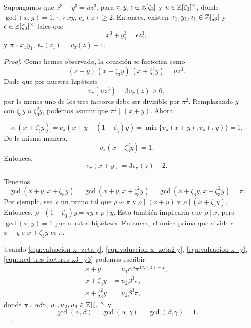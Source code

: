 \begin{lema}[Descenso]
  \label{lema:FLT-3-3}
  Supongamos que $x^3 + y^3 = uz^3$, para $x,y,z\in \mathbb{Z}[\zeta_3]$ y
  $u \in \mathbb{Z} [\zeta_3]^\times$, donde $\gcd (x,y) = 1$, $\pi \nmid xy$,
  $v_\pi (z) \ge 2$. Entonces, existen $x_1, y_1, z_1 \in \mathbb{Z} [\zeta_3]$
  y $\epsilon \in \mathbb{Z} [\zeta_3]^\times$ tales que
  $$x_1^3 + y_1^3 = \epsilon z_1^3,$$
  y $\pi \nmid x_1 y_1$, $v_\pi (z_1) = v_\pi (z) - 1$.

  \begin{proof}
    Como hemos observado, la ecuación se factoriza como
    $$(x + y) \, (x + \zeta_3 y) \, (x + \zeta_3^2 y) = uz^3.$$
    Dado que por nuestra hipótesis
    $$v_\pi (uz^3) = 3 v_\pi (z) \ge 6,$$
    por lo menos uno de los tres factores debe ser divisible por
    $\pi^2$. Remplazando $y$ con $\zeta_3 y$ o $\zeta_3^2 y$, podemos asumir que
    $\pi^2 \mid (x + y)$. Ahora

    \begin{equation}
      \label{eqn:valuacion-x+zeta-y}
      v_\pi (x + \zeta_3 y) = v_\pi (x + y - (1 - \zeta_3) y)
          = \min \{ v_\pi (x+y), v_\pi (\pi y) \} = 1.
    \end{equation}
    De la misma manera,
    \begin{equation}
      \label{eqn:valuacion-x+zeta2-y}
      v_\pi (x + \zeta_3^2 y) = 1.
    \end{equation}
    Entonces,
    \begin{equation}
      \label{eqn:valuacion-x+y}
      v_\pi (x+y) = 3 v_\pi (z) - 2.
    \end{equation}

    Tenemos
    \begin{equation}
      \label{eqn:mcd-tres-factores-x3+y3}
      \gcd (x + y, x + \zeta_3 y) = \gcd (x + y, x + \zeta_3^2 y)
          = \gcd (x + \zeta_3 y, x + \zeta_3^2 y) = \pi.
    \end{equation}
    Por ejemplo, sea $\rho$ un primo tal que $\rho \not\sim \pi$ y
    $\rho \mid (x+y)$ y $\rho \mid (x + \zeta_3 y)$. Entonces,
    $\rho \mid (1 - \zeta_3) y = \pi y$ e $\rho \mid y$. Esto también implicaría
    que $\rho \mid x$, pero $\gcd (x,y) = 1$ por nuestra hipótesis. Entonces,
    el único primo que divide a $x + y$ e $x + \zeta_3 y$ es $\pi$.

    Usando \eqref{eqn:valuacion-x+zeta-y}, \eqref{eqn:valuacion-x+zeta2-y},
    \eqref{eqn:valuacion-x+y}, \eqref{eqn:mcd-tres-factores-x3+y3} podemos
    escribir
    \begin{align*}
      \tag{a} x + y & = u_1 \alpha^3 \pi^{3 v_\pi (z) - 2},\\
      \tag{b} x + \zeta_3 y & = u_2 \beta^3 \pi,\\
      \tag{c} x + \zeta_3^2 y & = u_2 \beta^3 \pi,
    \end{align*}
    donde $\pi \nmid \alpha\beta\gamma$, $u_1,u_2,u_3 \in \mathbb{Z} [\zeta_3]^\times$ y
    $$\gcd (\alpha,\beta) = \gcd (\alpha,\gamma) = \gcd (\beta,\gamma) = 1.$$


\end{proof}
\end{lema}

